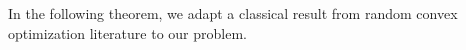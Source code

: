%
In the following theorem, we adapt a classical result from random convex optimization literature to our problem.
